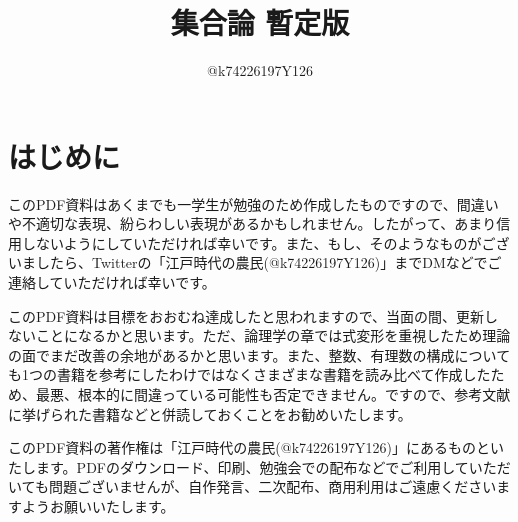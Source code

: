 \documentclass[10pt,a4paper,titlepage]{jsarticle}
\title{集合論 暫定版}
\author{@k74226197Y126}
\begin{document}
\maketitle
{}
\section*{はじめに}
このPDF資料はあくまでも一学生が勉強のため作成したものですので、間違いや不適切な表現、紛らわしい表現があるかもしれません。したがって、あまり信用しないようにしていただければ幸いです。また、もし、そのようなものがございましたら、Twitterの「江戸時代の農民(@k74226197Y126)」までDMなどでご連絡していただければ幸いです。\par
このPDF資料は目標をおおむね達成したと思われますので、当面の間、更新しないことになるかと思います。ただ、論理学の章では式変形を重視したため理論の面でまだ改善の余地があるかと思います。また、整数、有理数の構成についても1つの書籍を参考にしたわけではなくさまざまな書籍を読み比べて作成したため、最悪、根本的に間違っている可能性も否定できません。ですので、参考文献に挙げられた書籍などと併読しておくことをお勧めいたします。\par
このPDF資料の著作権は「江戸時代の農民(@k74226197Y126)」にあるものといたします。PDFのダウンロード、印刷、勉強会での配布などでご利用していただいても問題ございませんが、自作発言、二次配布、商用利用はご遠慮くださいますようお願いいたします。
\tableofcontents
\clearpage
{}


\clearpage


\clearpage

\clearpage

\clearpage

\clearpage

\clearpage

\clearpage

\clearpage

\clearpage

\clearpage


\clearpage

\clearpage

\end{document}
